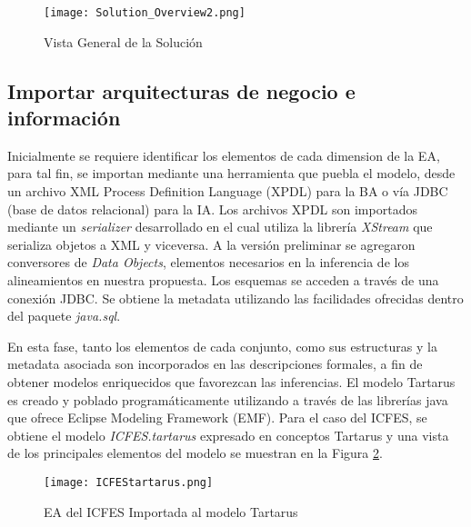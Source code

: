 \begin{figure} [!t]
\begin{center}
	\texttt{[image: Solution\_Overview2.png]}
	\caption{Vista General de la Soluci\'on}
	\label{fig:Solution}
\end{center}
\end{figure}


\subsection{Importar arquitecturas de negocio e informaci\'on}

Inicialmente se requiere identificar los elementos de cada dimension de la EA, para tal fin, se importan mediante una herramienta que puebla el modelo, desde un archivo XML Process Definition Language (XPDL) para la BA o v\'ia JDBC (base de datos relacional) para la IA. Los archivos XPDL son importados mediante un \textit{serializer} desarrollado en \cite{Rodriguez:2011} el cual utiliza la librer\'ia \textit{XStream} que serializa objetos a XML y viceversa. A la versi\'on preliminar se agregaron conversores de \textit{Data Objects}, elementos necesarios en la inferencia de los alineamientos en nuestra propuesta. Los esquemas se acceden a trav\'es de una conexi\'on JDBC. Se obtiene la metadata utilizando las facilidades ofrecidas dentro del paquete \textit{java.sql}. 

En esta fase, tanto los elementos de cada conjunto, como sus estructuras y la metadata asociada son incorporados en las descripciones formales, a fin de obtener modelos enriquecidos que favorezcan las inferencias. El modelo Tartarus es creado y poblado program\'aticamente utilizando a trav\'es de las librer\'ias java que ofrece Eclipse Modeling Framework (EMF). Para el caso del ICFES, se obtiene el modelo \textit{ICFES.tartarus} expresado en conceptos Tartarus y una vista de los principales elementos del modelo se muestran en la Figura \ref{fig:icfesmodel}. 

\begin{figure} [!t]
\begin{center}
	\texttt{[image: ICFEStartarus.png]}
	\caption{EA del ICFES Importada al modelo Tartarus}
	\label{fig:icfesmodel}
\end{center}
\end{figure}

